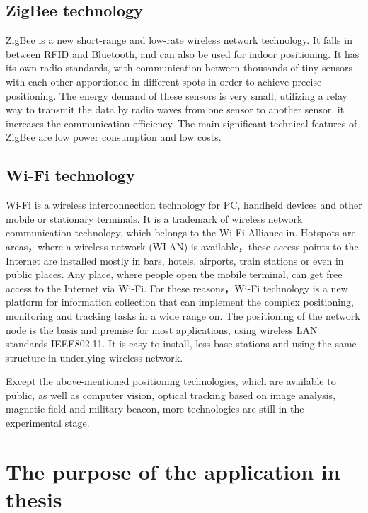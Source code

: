 \subsection{ZigBee technology}

ZigBee is a new short-range and low-rate wireless network technology. It falls in between RFID and Bluetooth, and can also be used for indoor positioning\cite{DrRainerMautz2012}. It has its own radio standards, with communication between thousands of tiny sensors with each other apportioned in different spots in order to achieve precise positioning. The energy demand of these sensors is very small, utilizing a relay way to transmit the data by radio waves from one sensor to another sensor, it increases the communication efficiency. The main significant technical features of ZigBee are low power consumption and low costs.    

\subsection{Wi-Fi technology}

Wi-Fi is a wireless interconnection technology for PC, handheld devices and other mobile or stationary terminals. It is a trademark of wireless network communication technology, which belongs to the Wi-Fi Alliance in\cite{Cisco2006}. Hotspots are areas，where a wireless network (WLAN) is available，these access points to the Internet are installed mostly in bars, hotels, airports, train stations or even in public places. Any place, where people open the mobile terminal, can get free access to the Internet via Wi-Fi. For these reasons，Wi-Fi technology is a new platform for information collection that can implement the complex positioning, monitoring and tracking tasks in a wide range on\cite{DavidP}\cite{AnandBalachandran2003}. The positioning of the network node is the basis and premise for most applications, using wireless LAN standards IEEE802.11. It is easy to install, less base stations and using the same structure in underlying wireless network.    

Except the above-mentioned positioning technologies, which are available to public, as well as computer vision, optical tracking based on image analysis, magnetic field and military beacon, more technologies are still in the experimental stage.    

\section{The purpose of the application in thesis}


